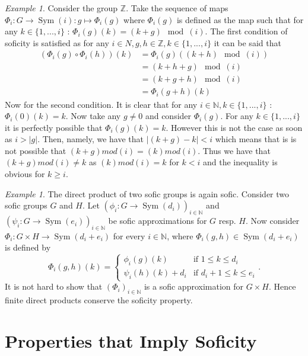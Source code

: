 \documentclass[titlepage, a4paper]{article}
\newcommand{\N}{\mathbb{N}}
\newcommand{\Z}{\mathbb{Z}}
\DeclareMathOperator{\sym}{Sym}
\theoremstyle{remark}
\newtheorem{example}[theorem]{Example}
\begin{document}
	\begin{example}\label{ex:Z}
	Consider the group $\Z$. Take the sequence of maps $\Phi_{i}: G \to \sym(i): g \mapsto \Phi_{i}(g)$ where $\Phi_{i}(g)$ is defined as the map such that for any $k \in \{1,...,i\}$ : $ \Phi_{i}(g)(k) = (k+g) \mod(i)$. The first condition of soficity is satisfied as for any $i \in N, g,h \in \Z, k \in \{1,..., i\}$ it can be said that 
	\begin{align*}
	(\Phi_{i}(g) \circ \Phi_{i}(h))(k) &= \Phi_{i}(g)((k+h)\mod(i))\\
	&= (k+h+g)\mod(i)\\
	&= (k+g+h)\mod(i)\\
	&= \Phi_{i}(g+h)(k)
\end{align*}		
	Now for the second condition. It is clear that for any $i \in \N, k \in \{1,..., i\}$ : $\Phi_{i}(0)(k) = k$. Now take any $g \neq 0$ and consider $\Phi_{i}(g)$. For any $k \in \{1,...,i\}$ it is perfectly possible that $\Phi_{i}(g)(k) = k$. However this is not the case as soon as $i > |g|$. Then, namely, we have that $|(k+g)-k| < i$ which means that is is not possible that $(k+g)mod(i) = (k)mod(i)$. Thus we have that $(k+g)mod(i) \neq k$ as $(k)mod(i) = k$ for $k<i$ and the inequality is obvious for $k \geq i$.
	\end{example}

    \begin{example}\label{ex:direct_product_sofic}
        The direct product of two sofic groups is again sofic. Consider two sofic groups $G$ and $H$. Let $(\phi_i: G \to \sym(d_i))_{i \in \N}$ and $(\psi_i: G \to \sym(e_i))_{i \in \N}$ be sofic approximations for $G$ resp. $H$. Now consider $\Phi_i : G \times H \to \sym(d_i+e_i)$ for every $i \in \N$, where $\Phi_i(g, h) \in \sym(d_i+e_i)$ is defined by
        \[
            \Phi_i(g,h)(k) = \begin{cases} \phi_i(g)(k) & \text{if } 1 \leq k \leq d_i \\
            \psi_i(h)(k)+d_i & \text{if } d_i + 1 \leq k \leq e_i
            \end{cases}.
        \]
        It is not hard to show that $(\Phi_i)_{i \in \N}$ is a sofic approximation for $G \times H$. %
        Hence finite direct products conserve the soficity property.
    \end{example}


    \section{Properties that Imply Soficity}
\end{document}

